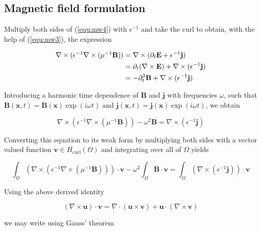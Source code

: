 \documentclass[11pt, a4paper]{article}
\begin{document}
\subsection{Magnetic field formulation}
\label{subsec:magneticfield}

Multiply both sides of (\ref{equ:mw4}) with $\epsilon^{-1}$ and take the curl to obtain,
with the help of (\ref{equ:mw3}), the expression

\begin{align}
    \nabla \times (\epsilon^{-1} \nabla \times (\mu^{-1} \mathbf{B}))
    &= \nabla \times (\partial_t \mathbf{E} + \epsilon^{-1} \mathbf{j}) \notag \\ 
    &= \partial_t (\nabla \times \mathbf{E}) + \nabla \times (\epsilon^{-1} \mathbf{j}) \notag \\ 
    &= -\partial_t^2 \mathbf{B} + \nabla \times (\epsilon^{-1} \mathbf{j})
\end{align}

Introducing a harmonic time dependence
of $\mathbf{B}$ and $\mathbf{j}$ with frequencies $\omega$, such that $\mathbf{B}(\mathbf{x}, t) = 
\mathbf{B}(\mathbf{x})\exp(i \omega t)$ and $\mathbf{j}(\mathbf{x}, t) = 
\mathbf{j}(\mathbf{x})\exp(i \omega t)$, we obtain 

\begin{equation}
    \nabla \times (\epsilon^{-1} \nabla \times (\mu^{-1} \mathbf{B})) - \omega^2 \mathbf{B}
    = \nabla \times (\epsilon^{-1} \mathbf{j})
\end{equation}

Converting this equation to its weak form by multiplying both sides with a
vector valued function $\mathbf{v} \in H_{\text{curl}}(\Omega)$ and integrating
over all of $\Omega$ yields

\begin{equation}
    \int_{\Omega} (\nabla \times (\epsilon^{-1} \nabla \times (\mu^{-1} \mathbf{B}))) \cdot \mathbf{v}
    - \omega^2 \int_{\Omega} \mathbf{B} \cdot \mathbf{v}
    = \int_{\Omega} (\nabla \times (\epsilon^{-1} \mathbf{j})) \cdot \mathbf{v}
\end{equation}

Using the above derived identity

\begin{equation}
    (\nabla \times \mathbf{u}) \cdot \mathbf{v}
    = \nabla \cdot (\mathbf{u} \times \mathbf{v})
    + \mathbf{u} \cdot (\nabla \times \mathbf{v})
\end{equation}

we may write using Gauss' theorem
\end{document}
